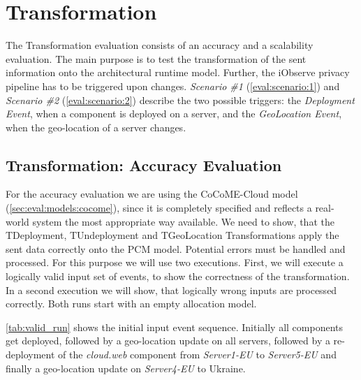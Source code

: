 \section{Transformation}
\label{sec:Evaluation:monitoring}

The Transformation evaluation consists of an accuracy and a scalability evaluation. The main purpose is to test the transformation of the sent information onto the architectural runtime model. Further, the iObserve privacy pipeline has to be triggered upon changes. \textit{Scenario \#1} (\autoref{eval:scenario:1}) and \textit{Scenario \#2} (\autoref{eval:scenario:2}) describe the two possible triggers: the \textit{Deployment Event}, when a component is deployed on a server, and the \textit{GeoLocation Event}, when the geo-location of a server changes. 

\subsection{Transformation: Accuracy Evaluation}

For the accuracy evaluation we are using the CoCoME-Cloud model (\autoref{sec:eval:models:cocome}), since it is completely specified and reflects a real-world system the most appropriate way available. We need to show, that the TDeployment, TUndeployment and TGeoLocation Transformations apply the sent data correctly onto the PCM model. Potential errors must be handled and processed. For this purpose we will use two executions. First, we will execute a logically valid input set of events, to show the correctness of the transformation. In a second execution we will show, that logically wrong inputs are processed correctly. Both runs start with an empty allocation model.

\autoref{tab:valid_run} shows the initial input event sequence. Initially all components get deployed, followed by a geo-location update on all servers, followed by a re-deployment of the \textit{cloud.web} component from \textit{Server1-EU} to \textit{Server5-EU} and finally a geo-location update on \textit{Server4-EU} to Ukraine.

